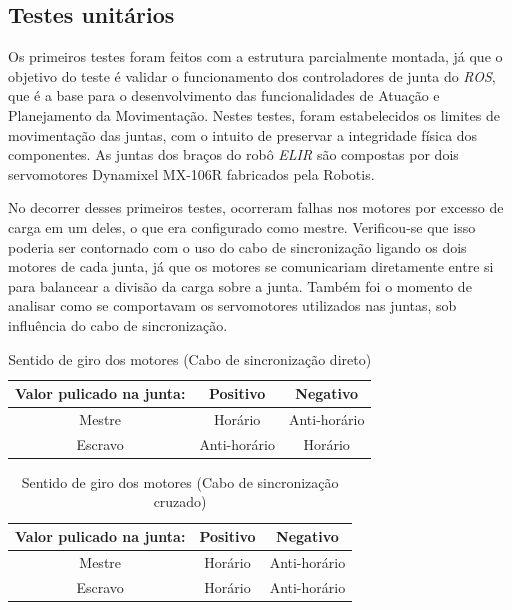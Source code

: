 \subsection{Testes unitários}\label{sec:test_mov_uni}
Os primeiros testes foram feitos com a estrutura parcialmente montada, já que o objetivo do teste é validar o funcionamento dos controladores de junta do \textit{ROS}, que é a base para o desenvolvimento das funcionalidades de Atuação e Planejamento da Movimentação. Nestes testes, foram estabelecidos os limites de movimentação das juntas, com o intuito de preservar a integridade física dos componentes. As juntas dos braços do robô \textit{ELIR} são compostas por dois servomotores Dynamixel MX-106R fabricados pela Robotis. 

No decorrer desses primeiros testes, ocorreram falhas nos motores por excesso de carga em um deles, o que era configurado como mestre. Verificou-se que isso poderia ser contornado com o uso do cabo de sincronização ligando os dois motores de cada junta, já que os motores se comunicariam diretamente entre si para balancear a divisão da carga sobre a junta. Também foi o momento de analisar como se comportavam os servomotores utilizados nas juntas, sob influência do cabo de sincronização.
\begin{table}[H]
	\centering
	\caption{Sentido de giro dos motores (Cabo de sincronização direto)}
	\begin{tabular}{ccc}	
			\hline
		\multicolumn{1}{r}{Valor pulicado na junta:}      & Positivo         & Negativo         \\ \hline
		Mestre                                            & Horário          & Anti-horário     \\ \hline
		Escravo                                           & Anti-horário     & Horário          \\ \hline
	\end{tabular}
\end{table}

\begin{table}[H]
	\centering
	\caption{Sentido de giro dos motores (Cabo de sincronização cruzado)}
	\begin{tabular}{ccc}
		\hline
		
		\multicolumn{1}{r}{Valor pulicado na junta:}       & Positivo       & Negativo           \\ \hline
		Mestre                                             & Horário        & Anti-horário       \\ \hline
		Escravo                                            & Horário        & Anti-horário       \\ \hline
	\end{tabular}
\end{table}

